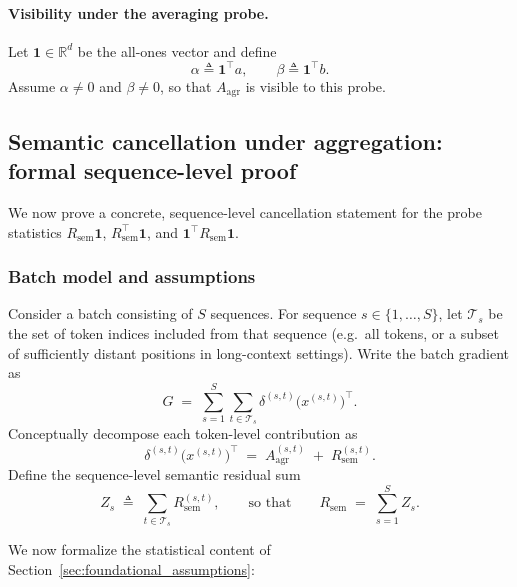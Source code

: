 \paragraph{Visibility under the averaging probe.}
Let $\mathbf{1}\in\mathbb{R}^d$ be the all-ones vector and define
\begin{equation}
\label{eq:alpha_beta}
\alpha \triangleq \mathbf{1}^\top a,
\qquad
\beta \triangleq \mathbf{1}^\top b.
\end{equation}
Assume $\alpha\neq 0$ and $\beta\neq 0$, so that $A_{\mathrm{agr}}$ is visible to this probe.

\subsection{Semantic cancellation under aggregation: formal sequence-level proof}
\label{sec:semantic_cancellation_proof}

We now prove a concrete, sequence-level cancellation statement for the probe statistics
$R_{\mathrm{sem}}\mathbf{1}$, $R_{\mathrm{sem}}^\top\mathbf{1}$, and $\mathbf{1}^\top R_{\mathrm{sem}}\mathbf{1}$.

\subsubsection{Batch model and assumptions}

Consider a batch consisting of $S$ sequences. For sequence $s\in\{1,\dots,S\}$,
let $\mathcal{T}_s$ be the set of token indices included from that sequence
(e.g.\ all tokens, or a subset of sufficiently distant positions in long-context settings).
Write the batch gradient as
\begin{equation}
\label{eq:G_seq_sum}
G \;=\; \sum_{s=1}^S \sum_{t\in\mathcal{T}_s} \delta^{(s,t)} \bigl(x^{(s,t)}\bigr)^\top.
\end{equation}
Conceptually decompose each token-level contribution as
\begin{equation}
\label{eq:token_decomp}
\delta^{(s,t)} \bigl(x^{(s,t)}\bigr)^\top
\;=\;
A_{\mathrm{agr}}^{(s,t)} \;+\; R_{\mathrm{sem}}^{(s,t)}.
\end{equation}
Define the sequence-level semantic residual sum
\begin{equation}
\label{eq:Zs_def}
Z_s \;\triangleq\; \sum_{t\in\mathcal{T}_s} R_{\mathrm{sem}}^{(s,t)},
\qquad\text{so that}\qquad
R_{\mathrm{sem}} \;=\; \sum_{s=1}^S Z_s.
\end{equation}

We now formalize the statistical content of Section~\ref{sec:foundational_assumptions}:

